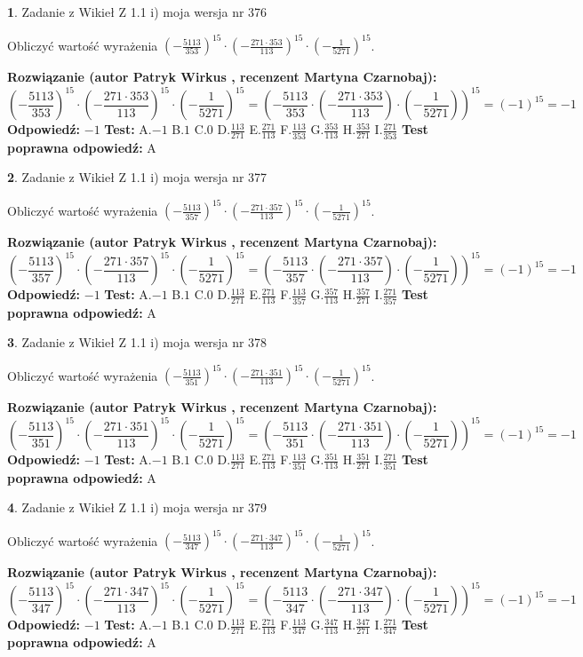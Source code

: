 \documentclass[12pt, a4paper]{article}
\theoremstyle{definition} %
\newtheorem{zad}{}
\newcommand{\zadStart}[1]{\begin{zad}#1\newline}
\newcommand{\zadStop}{\end{zad}}
\newcommand{\rozwStart}[2]{\noindent \textbf{Rozwiązanie (autor #1 , recenzent #2): }\newline}
\newcommand{\rozwStop}{\newline}
\newcommand{\odpStart}{\noindent \textbf{Odpowiedź:}\newline}
\newcommand{\odpStop}{\newline}
\newcommand{\testStart}{\noindent \textbf{Test:}\newline}
\newcommand{\testStop}{\newline}
\newcommand{\kluczStart}{\noindent \textbf{Test poprawna odpowiedź:}\newline}
\newcommand{\kluczStop}{\newline}
\begin{document}
\zadStart{Zadanie z Wikieł Z 1.1 i) moja wersja nr 376}

Obliczyć wartość wyrażenia $(-\frac{5113}{353})^{15} \cdot (-\frac{271 \cdot 353}{113})^{15} \cdot (-\frac{1}{5271})^{15}$.
\zadStop
\rozwStart{Patryk Wirkus}{Martyna Czarnobaj}
$$(-\frac{5113}{353})^{15} \cdot (-\frac{271 \cdot 353}{113})^{15} \cdot (-\frac{1}{5271})^{15} = (-\frac{5113}{353} \cdot (-\frac{271 \cdot 353}{113}) \cdot (-\frac{1}{5271}))^{15} = (-1)^{15} = -1$$
\rozwStop
\odpStart
$-1$
\odpStop
\testStart
A.$-1$ B.$1$ C.$0$ D.$\frac{113}{271}$ E.$\frac{271}{113}$
F.$\frac{113}{353}$ G.$\frac{353}{113}$
H.$\frac{353}{271}$
I.$\frac{271}{353}$
\testStop
\kluczStart
A
\kluczStop



\zadStart{Zadanie z Wikieł Z 1.1 i) moja wersja nr 377}

Obliczyć wartość wyrażenia $(-\frac{5113}{357})^{15} \cdot (-\frac{271 \cdot 357}{113})^{15} \cdot (-\frac{1}{5271})^{15}$.
\zadStop
\rozwStart{Patryk Wirkus}{Martyna Czarnobaj}
$$(-\frac{5113}{357})^{15} \cdot (-\frac{271 \cdot 357}{113})^{15} \cdot (-\frac{1}{5271})^{15} = (-\frac{5113}{357} \cdot (-\frac{271 \cdot 357}{113}) \cdot (-\frac{1}{5271}))^{15} = (-1)^{15} = -1$$
\rozwStop
\odpStart
$-1$
\odpStop
\testStart
A.$-1$ B.$1$ C.$0$ D.$\frac{113}{271}$ E.$\frac{271}{113}$
F.$\frac{113}{357}$ G.$\frac{357}{113}$
H.$\frac{357}{271}$
I.$\frac{271}{357}$
\testStop
\kluczStart
A
\kluczStop



\zadStart{Zadanie z Wikieł Z 1.1 i) moja wersja nr 378}

Obliczyć wartość wyrażenia $(-\frac{5113}{351})^{15} \cdot (-\frac{271 \cdot 351}{113})^{15} \cdot (-\frac{1}{5271})^{15}$.
\zadStop
\rozwStart{Patryk Wirkus}{Martyna Czarnobaj}
$$(-\frac{5113}{351})^{15} \cdot (-\frac{271 \cdot 351}{113})^{15} \cdot (-\frac{1}{5271})^{15} = (-\frac{5113}{351} \cdot (-\frac{271 \cdot 351}{113}) \cdot (-\frac{1}{5271}))^{15} = (-1)^{15} = -1$$
\rozwStop
\odpStart
$-1$
\odpStop
\testStart
A.$-1$ B.$1$ C.$0$ D.$\frac{113}{271}$ E.$\frac{271}{113}$
F.$\frac{113}{351}$ G.$\frac{351}{113}$
H.$\frac{351}{271}$
I.$\frac{271}{351}$
\testStop
\kluczStart
A
\kluczStop



\zadStart{Zadanie z Wikieł Z 1.1 i) moja wersja nr 379}

Obliczyć wartość wyrażenia $(-\frac{5113}{347})^{15} \cdot (-\frac{271 \cdot 347}{113})^{15} \cdot (-\frac{1}{5271})^{15}$.
\zadStop
\rozwStart{Patryk Wirkus}{Martyna Czarnobaj}
$$(-\frac{5113}{347})^{15} \cdot (-\frac{271 \cdot 347}{113})^{15} \cdot (-\frac{1}{5271})^{15} = (-\frac{5113}{347} \cdot (-\frac{271 \cdot 347}{113}) \cdot (-\frac{1}{5271}))^{15} = (-1)^{15} = -1$$
\rozwStop
\odpStart
$-1$
\odpStop
\testStart
A.$-1$ B.$1$ C.$0$ D.$\frac{113}{271}$ E.$\frac{271}{113}$
F.$\frac{113}{347}$ G.$\frac{347}{113}$
H.$\frac{347}{271}$
I.$\frac{271}{347}$
\testStop
\kluczStart
A
\kluczStop
\end{document}
